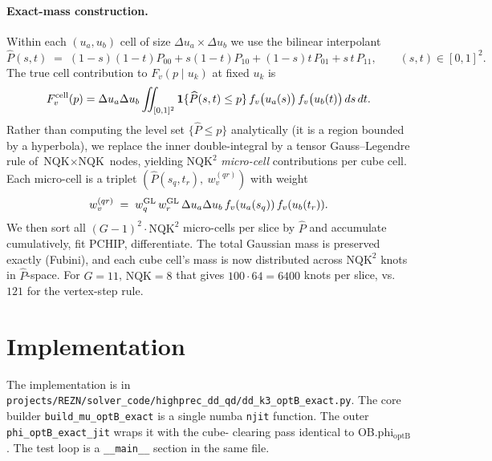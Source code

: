 \documentclass[10pt]{article}
\begin{document}
\paragraph{Exact-mass construction.} Within each $(u_a,u_b)$ cell of size
$\Delta u_a\times\Delta u_b$ we use the bilinear interpolant
\begin{equation}
  \widehat P(s,t) \;=\; (1{-}s)(1{-}t)P_{00} + s(1{-}t)P_{10}
                          + (1{-}s)t\,P_{01} + s\,t\,P_{11},
  \qquad (s,t)\in[0,1]^2.
\end{equation}
The true cell contribution to $F_v(p\mid u_k)$ at fixed $u_k$ is
\begin{equation}\label{eq:cell-int}
  F_v^{\rm cell}(p)
  = \Delta u_a\Delta u_b \int\!\!\!\!\int_{[0,1]^2}
       \mathbf 1\{\widehat P(s,t)\le p\}\,
       f_v\bigl(u_a(s)\bigr)\,f_v\bigl(u_b(t)\bigr)\,ds\,dt.
\end{equation}
Rather than computing the level set $\{\widehat P\le p\}$ analytically (it
is a region bounded by a hyperbola), we replace the inner double-integral
by a tensor Gauss--Legendre rule of $\text{NQK}\times\text{NQK}$ nodes,
yielding $\text{NQK}^2$ \emph{micro-cell} contributions per cube cell. Each
micro-cell is a triplet
$(\widehat P(s_q,t_r),\ w_v^{(qr)})$ with weight
\[
  w_v^{(qr)} \;=\; w_q^{\rm GL}\,w_r^{\rm GL}\,
                       \Delta u_a\Delta u_b\,f_v(u_a(s_q))\,f_v(u_b(t_r)).
\]
We then sort all $(G-1)^2\cdot\text{NQK}^2$ micro-cells per slice by
$\widehat P$ and accumulate cumulatively, fit PCHIP, differentiate. The
total Gaussian mass is preserved exactly (Fubini), and each cube cell's
mass is now distributed across $\text{NQK}^2$ knots in $\widehat P$-space.
For $G=11$, $\text{NQK}=8$ that gives $100\cdot 64=6400$ knots per slice,
vs.\ $121$ for the vertex-step rule.

\section{Implementation}

The implementation is in
\verb|projects/REZN/solver_code/highprec_dd_qd/dd_k3_optB_exact.py|. The
core builder \texttt{build\_mu\_optB\_exact} is a single numba \texttt{njit}
function. The outer \texttt{phi\_optB\_exact\_jit} wraps it with the cube-
clearing pass identical to OB.phi$_{\text{optB}}$. The test loop is a
\verb|__main__| section in the same file.
\end{document}
